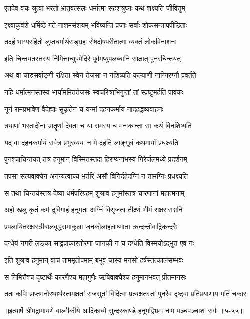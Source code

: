 \twolineshloka
{एतदेव वचः श्रुत्वा भरतो भ्रातृवत्सलः}
{धर्मात्मा सहशत्रुघ्नः कथं शक्ष्यति जीवितुम्} %

\twolineshloka
{इक्ष्वाकुवंशे धर्मिष्ठे गते नाशमसंशयम्}
{भविष्यन्ति प्रजाः सर्वाः शोकसन्तापपीडिताः} %

\twolineshloka
{तदहं भाग्यरहितो लुप्तधर्मार्थसङ्ग्रहः}
{रोषदोषपरीतात्मा व्यक्तं लोकविनाशनः} %

\twolineshloka
{इति चिन्तयतस्तस्य निमित्तान्युपपेदिरे}
{पूर्वमप्युपलब्धानि साक्षात् पुनरचिन्तयत्} %

\twolineshloka
{अथ वा चारुसर्वाङ्गी रक्षिता स्वेन तेजसा}
{न नशिष्यति कल्याणी नाग्निरग्नौ प्रवर्तते} %

\twolineshloka
{नहि धर्मात्मनस्तस्य भार्याममिततेजसः}
{स्वचरित्राभिगुप्तां तां स्प्रष्टुमर्हति पावकः} %

\twolineshloka
{नूनं रामप्रभावेण वैदेह्याः सुकृतेन च}
{यन्मां दहनकर्मायं नादहद्धव्यवाहनः} %

\twolineshloka
{त्रयाणां भरतादीनां भ्रातॄणां देवता च या}
{रामस्य च मनःकान्ता सा कथं विनशिष्यति} %

\twolineshloka
{यद् वा दहनकर्मायं सर्वत्र प्रभुरव्ययः}
{न मे दहति लाङ्गूलं कथमार्यां प्रधक्ष्यति} %

\twolineshloka
{पुनश्चाचिन्तयत् तत्र हनूमान् विस्मितस्तदा}
{हिरण्यनाभस्य गिरेर्जलमध्ये प्रदर्शनम्} %

\twolineshloka
{तपसा सत्यवाक्येन अनन्यत्वाच्च भर्तरि}
{असौ विनिर्दहेदग्निं न तामग्निः प्रधक्ष्यति} %

\twolineshloka
{स तथा चिन्तयंस्तत्र देव्या धर्मपरिग्रहम्}
{शुश्राव हनुमांस्तत्र चारणानां महात्मनाम्} %

\twolineshloka
{अहो खलु कृतं कर्म दुर्विगाहं हनूमता}
{अग्निं विसृजता तीक्ष्णं भीमं राक्षससद्मनि} %

\twolineshloka
{प्रपलायितरक्षःस्त्रीबालवृद्धसमाकुला}
{जनकोलाहलाध्माता क्रन्दन्तीवाद्रिकन्दरैः} %

\twolineshloka
{दग्धेयं नगरी लङ्का साट्टप्राकारतोरणा}
{जानकी न च दग्धेति विस्मयोऽद्भुत एव नः} %

\twolineshloka
{इति शुश्राव हनुमान् वाचं ताममृतोपमाम्}
{बभूव चास्य मनसो हर्षस्तत्कालसम्भवः} %

\twolineshloka
{स निमित्तैश्च दृष्टार्थैः कारणैश्च महागुणैः}
{ऋषिवाक्यैश्च हनुमानभवत् प्रीतमानसः} %

\twolineshloka
{ततः कपिः प्राप्तमनोरथार्थस्तामक्षतां राजसुतां विदित्वा}
{प्रत्यक्षतस्तां पुनरेव दृष्ट्वा प्रतिप्रयाणाय मतिं चकार} %


॥इत्यार्षे श्रीमद्रामायणे वाल्मीकीये आदिकाव्ये सुन्दरकाण्डे हनूमद्विभ्रमः नाम पञ्चपञ्चाशः सर्गः ॥५-५५॥
